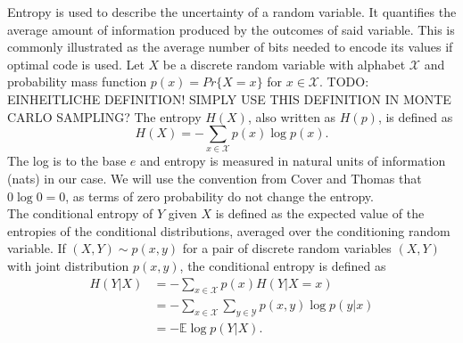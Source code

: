Entropy is used to describe the uncertainty of a random variable. It quantifies the average amount of information produced by the outcomes of said variable. This is commonly illustrated as the average number of bits needed to encode its values if optimal code is used. Let $X$ be a discrete random variable with alphabet $\mathcal{X}$ and probability mass function $p(x)=Pr\{X=x\}$ for $x\in \mathcal{X}$. TODO: EINHEITLICHE DEFINITION! SIMPLY USE THIS DEFINITION IN MONTE CARLO SAMPLING?
The entropy $H(X)$, also written as $H(p)$, is defined as
\begin{equation}
    H(X) = -\sum_{x \in \mathcal{X}} p(x) \log p(x).
\end{equation}
The log is to the base $e$ and entropy is measured in natural units of information (nats) in our case. We will use the convention from Cover and Thomas \cite{Cover2005} that $0 \log 0 = 0$, as terms of zero probability do not change the entropy. %
\\
The conditional entropy of $Y$ given $X$ is defined as the expected value of the entropies of the conditional distributions, averaged over the conditioning random variable. If $(X,Y) \sim p(x,y)$ for a pair of discrete random variables $(X,Y)$ with joint distribution $p(x,y)$, the conditional entropy is defined as
\begin{align}
    H(Y|X)&= -\sum_{x \in \mathcal{X}} p(x) H(Y|X=x) \\
    &= - \sum_{x \in \mathcal{X}} \sum_{y \in \mathcal{Y}}p(x,y) \log p(y|x) \\
    &= -\mathbb{E} \log p(Y|X).
\end{align}

